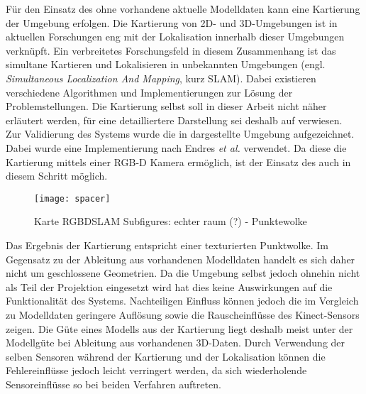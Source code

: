 Für den Einsatz des  ohne vorhandene aktuelle Modelldaten kann eine Kartierung \red[(Mapping)] der Umgebung erfolgen. Die Kartierung von 2D- und 3D-Umgebungen ist in aktuellen Forschungen eng mit der Lokalisation innerhalb dieser Umgebungen verknüpft. Ein verbreitetes Forschungsfeld in diesem Zusammenhang ist das simultane Kartieren und Lokalisieren in unbekannten Umgebungen (engl. \textit{Simultaneous Localization And Mapping}, kurz SLAM). Dabei existieren verschiedene Algorithmen und Implementierungen zur Lösung der Problemstellungen. Die Kartierung selbst soll in dieser Arbeit nicht näher erläutert werden, für eine detailliertere Darstellung sei deshalb auf  verwiesen.\\
Zur Validierung des Systems wurde die in  dargestellte Umgebung aufgezeichnet. Dabei wurde eine Implementierung \cite{Rgbdslam} nach Endres \textit{et al.} \cite{Endres2014} verwendet. Da diese die Kartierung mittels einer RGB-D Kamera ermöglich, ist der Einsatz des \kps{} auch in diesem Schritt möglich.

\begin{figure}[ht]
	\begin{center}
		\texttt{[image: spacer]}
		\caption{Karte RGBDSLAM Subfigures: echter raum (?) - Punktewolke}
		\label{fig.mapSLAM}
	\end{center}
\end{figure}

Das Ergebnis der Kartierung entspricht einer texturierten Punktwolke. Im Gegensatz zu der Ableitung aus vorhandenen Modelldaten handelt es sich daher nicht um geschlossene Geometrien. Da die Umgebung selbst jedoch ohnehin nicht als Teil der Projektion eingesetzt wird hat dies keine Auswirkungen auf die Funktionalität des Systems. Nachteiligen Einfluss können jedoch die im Vergleich zu Modelldaten geringere Auflösung sowie die Rauscheinflüsse des Kinect-Sensors zeigen. Die Güte eines Modells aus der Kartierung liegt deshalb meist unter der Modellgüte bei Ableitung aus vorhandenen 3D-Daten. Durch Verwendung der selben Sensoren während der Kartierung und der Lokalisation können die Fehlereinflüsse jedoch leicht verringert werden, da sich wiederholende Sensoreinflüsse so bei beiden Verfahren auftreten.\\

